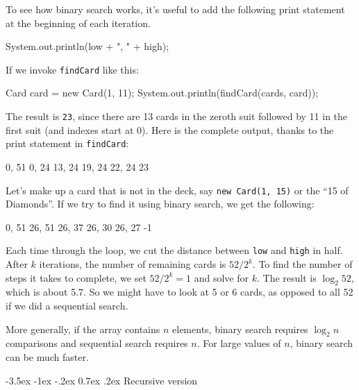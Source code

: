 \documentclass[12pt]{book}
\makeatletter
\theoremstyle{exercise}
\newcommand{\java}[1]{\verb"#1"}
\renewcommand{\section}{\@startsection{section}{1}{\z@}%
    {-3.5ex \@plus -1ex \@minus -.2ex}%
    {0.7ex \@plus.2ex}%
    {\normalfont\Large\bfseries}}
\newcommand{\java}[1]{\lstinline{#1}} %
\makeatother
\begin{document}
To see how binary search works, it's useful to add the following print statement at the beginning of each iteration.

\begin{code}
    System.out.println(low + ", " + high);
\end{code}

If we invoke \java{findCard} like this:

\begin{code}
    Card card = new Card(1, 11);
    System.out.println(findCard(cards, card));
\end{code}

The result is \java{23}, since there are 13 cards in the zeroth suit followed by 11 in the first suit (and indexes start at 0).
Here is the complete output, thanks to the print statement in \java{findCard}:

\begin{stdout}
0, 51
0, 24
13, 24
19, 24
22, 24
23
\end{stdout}

Let's make up a card that is not in the deck, say \java{new Card(1, 15)} or the ``15 of Diamonds''.
If we try to find it using binary search, we get the following:

\begin{stdout}
0, 51
26, 51
26, 37
26, 30
26, 27
-1
\end{stdout}

%

Each time through the loop, we cut the distance between \java{low} and \java{high} in half.
After $k$ iterations, the number of remaining cards is $52 / 2^k$.
To find the number of steps it takes to complete, we set $52 / 2^k = 1$ and solve for $k$.
The result is $\log_2 52$, which is about 5.7.
So we might have to look at 5 or 6 cards, as opposed to all 52 if we did a sequential search.

More generally, if the array contains $n$ elements, binary search requires $\log_2 n$ comparisons and sequential search requires $n$.
For large values of $n$, binary search can be much faster.


\section{Recursive version}
\end{document}
